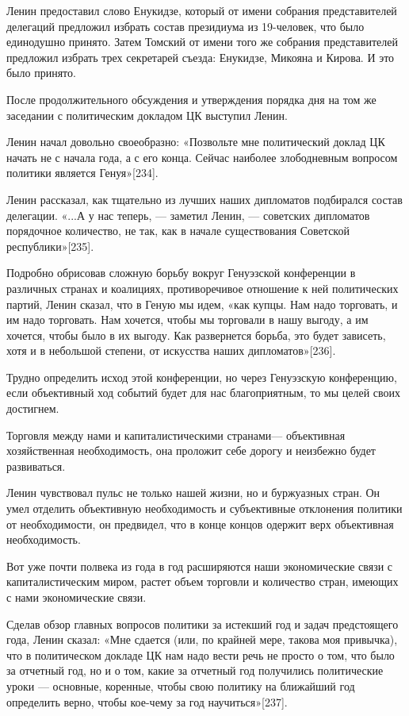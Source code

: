 \documentclass[12pt, a4paper, openany]{book}
\begin{document}
Ленин предоставил слово Енукидзе, который от имени собрания представителей делегаций предложил избрать состав президиума из 19-человек, что было единодушно принято. Затем Томский от имени того же собрания представителей предложил избрать трех секретарей съезда: Енукидзе, Микояна и Кирова. И это было принято.

После продолжительного обсуждения и утверждения порядка дня на том же заседании с политическим докладом ЦК выступил Ленин.

Ленин начал довольно своеобразно: «Позвольте мне политический доклад ЦК начать не с начала года, а с его конца. Сейчас наиболее злободневным вопросом политики является Генуя»[234].

Ленин рассказал, как тщательно из лучших наших дипломатов подбирался состав делегации. «...А у нас теперь, — заметил Ленин, — советских дипломатов порядочное количество, не так, как в начале существования Советской республики»[235].

Подробно обрисовав сложную борьбу вокруг Генуэзской конференции в различных странах и коалициях, противоречивое отношение к ней политических партий, Ленин сказал, что в Геную мы идем, «как купцы. Нам надо торговать, и им надо торговать. Нам хочется, чтобы мы торговали в нашу выгоду, а им хочется, чтобы было в их выгоду. Как развернется борьба, это будет зависеть, хотя и в небольшой степени, от искусства наших дипломатов»[236].

Трудно определить исход этой конференции, но через Генуэзскую конференцию, если объективный ход событий будет для нас благоприятным, то мы целей своих достигнем.

Торговля между нами и капиталистическими странами— объективная хозяйственная необходимость, она проложит себе дорогу и неизбежно будет развиваться.

Ленин чувствовал пульс не только нашей жизни, но и буржуазных стран. Он умел отделить объективную необходимость и субъективные отклонения политики от необходимости, он предвидел, что в конце концов одержит верх объективная необходимость.

Вот уже почти полвека из года в год расширяются наши экономические связи с капиталистическим миром, растет объем торговли и количество стран, имеющих с нами экономические связи.

Сделав обзор главных вопросов политики за истекший год и задач предстоящего года, Ленин сказал: «Мне сдается (или, по крайней мере, такова моя привычка), что в политическом докладе ЦК нам надо вести речь не просто о том, что было за отчетный год, но и о том, какие за отчетный год получились политические уроки — основные, коренные, чтобы свою политику на ближайший год определить верно, чтобы кое-чему за год научиться»[237].
\end{document}
